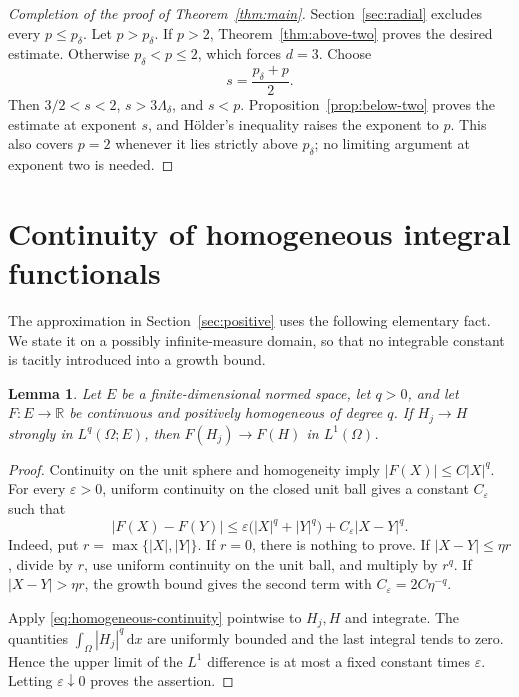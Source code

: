 \documentclass[11pt,a4paper,reqno]{amsart}
\theoremstyle{plain}
\newtheorem{lemma}[theorem]{Lemma}
\theoremstyle{remark}
\numberwithin{equation}{section}
\newcommand{\R}{\mathbb R}
\newcommand{\lam}{\Lambda_\delta}
\newcommand{\pcrit}{p_\delta}
\newcommand{\dd}{\,\mathrm d}
\begin{document}
\begin{proof}[Completion of the proof of Theorem~\ref{thm:main}]
Section~\ref{sec:radial} excludes every $p\le\pcrit$. Let $p>\pcrit$. If $p>2$, Theorem~\ref{thm:above-two} proves the desired estimate. Otherwise $\pcrit<p\le2$, which forces $d=3$. Choose
\[
 s=\frac{\pcrit+p}{2}.
\]
Then $3/2<s<2$, $s>3\lam$, and $s<p$. Proposition~\ref{prop:below-two} proves the estimate at exponent $s$, and H\"older's inequality raises the exponent to $p$. This also covers $p=2$ whenever it lies strictly above $\pcrit$; no limiting argument at exponent two is needed.
\end{proof}

\appendix
\section{Continuity of homogeneous integral functionals}\label{sec:appendix}
The approximation in Section~\ref{sec:positive} uses the following elementary fact. We state it on a possibly infinite-measure domain, so that no integrable constant is tacitly introduced into a growth bound.

\begin{lemma}\label{lem:homogeneous-continuity}
Let $E$ be a finite-dimensional normed space, let $q>0$, and let $F:E\to\R$ be continuous and positively homogeneous of degree $q$. If $H_j\to H$ strongly in $L^q(\Omega;E)$, then $F(H_j)\to F(H)$ in $L^1(\Omega)$.
\end{lemma}
\begin{proof}
Continuity on the unit sphere and homogeneity imply $|F(X)|\le C|X|^q$. For every $\varepsilon>0$, uniform continuity on the closed unit ball gives a constant $C_\varepsilon$ such that
\begin{equation}\label{eq:homogeneous-continuity}
 |F(X)-F(Y)|
 \le\varepsilon\bigl(|X|^q+|Y|^q\bigr)
                  +C_\varepsilon|X-Y|^q.
\end{equation}
Indeed, put $r=\max\{|X|,|Y|\}$. If $r=0$, there is nothing to prove. If $|X-Y|\le\eta r$, divide by $r$, use uniform continuity on the unit ball, and multiply by $r^q$. If $|X-Y|>\eta r$, the growth bound gives the second term with $C_\varepsilon=2C\eta^{-q}$.

Apply \eqref{eq:homogeneous-continuity} pointwise to $H_j,H$ and integrate. The quantities $\int_\Omega |H_j|^q\dd x$ are uniformly bounded and the last integral tends to zero. Hence the upper limit of the $L^1$ difference is at most a fixed constant times $\varepsilon$. Letting $\varepsilon\downarrow0$ proves the assertion.
\end{proof}
\end{document}
